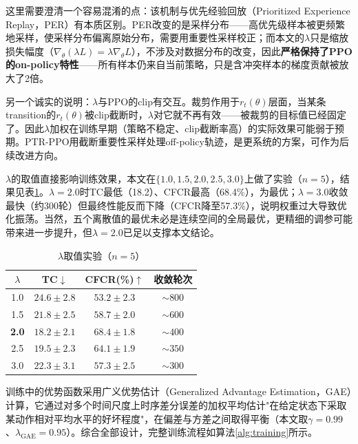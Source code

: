 \documentclass[12pt,a4paper,UTF8]{ctexart}
\begin{document}
这里需要澄清一个容易混淆的点：该机制与优先经验回放（Prioritized Experience Replay，PER）有本质区别。PER改变的是采样分布——高优先级样本被更频繁地采样，使采样分布偏离原始分布，需要用重要性采样校正；而本文的$\lambda$只是缩放损失幅度（$\nabla_\theta(\lambda L)=\lambda\nabla_\theta L$），不涉及对数据分布的改变，因此\textbf{严格保持了PPO的on-policy特性}——所有样本仍来自当前策略，只是含冲突样本的梯度贡献被放大了2倍。

另一个诚实的说明：$\lambda$与PPO的clip有交互。裁剪作用于$r_t(\theta)$层面，当某条transition的$r_t(\theta)$被clip截断时，$\lambda$对它就不再有效——被裁剪的目标值已经固定了。因此$\lambda$加权在训练早期（策略不稳定、clip截断率高）的实际效果可能弱于预期。PTR-PPO\cite{ref27}用截断重要性采样处理off-policy轨迹，是更系统的方案，可作为后续改进方向。

$\lambda$的取值直接影响训练效果，本文在$\{1.0, 1.5, 2.0, 2.5, 3.0\}$上做了实验（$n=5$），结果见表\ref{tab:lambda}。$\lambda=2.0$时TC最低（18.2）、CFCR最高（68.4\%），为最优；$\lambda=3.0$收敛最快（约300轮）但最终性能反而下降（CFCR降至57.3\%），说明权重过大导致优化振荡。当然，五个离散值的最优未必是连续空间的全局最优，更精细的调参可能带来进一步提升，但$\lambda=2.0$已足以支撑本文结论。

\begin{table}[H]
    \centering
    \caption{$\lambda$取值实验（$n=5$）}
    \label{tab:lambda}
    \begin{tabular}{|c|c|c|c|}
        \hline
        $\lambda$ & TC$\downarrow$ & CFCR(\%)$\uparrow$ & 收敛轮次 \\
        \hline
        1.0 & $24.6\pm2.8$ & $53.2\pm2.3$ & $\sim800$ \\
        1.5 & $21.8\pm2.5$ & $58.7\pm2.0$ & $\sim600$ \\
        \textbf{2.0} & $\mathbf{18.2\pm2.1}$ & $\mathbf{68.4\pm1.8}$ & $\sim400$ \\
        2.5 & $19.5\pm2.3$ & $64.1\pm1.9$ & $\sim350$ \\
        3.0 & $22.3\pm3.1$ & $57.3\pm2.5$ & $\sim300$ \\
        \hline
    \end{tabular}
\end{table}

训练中的优势函数采用广义优势估计（Generalized Advantage Estimation，GAE）\cite{ref38}计算，它通过对多个时间尺度上时序差分误差的加权平均估计"在给定状态下采取某动作相对平均水平的好坏程度"，在偏差与方差之间取得平衡（本文取$\gamma=0.99$、$\lambda_{\text{GAE}}=0.95$）。综合全部设计，完整训练流程如算法\ref{alg:training}所示。
\end{document}
